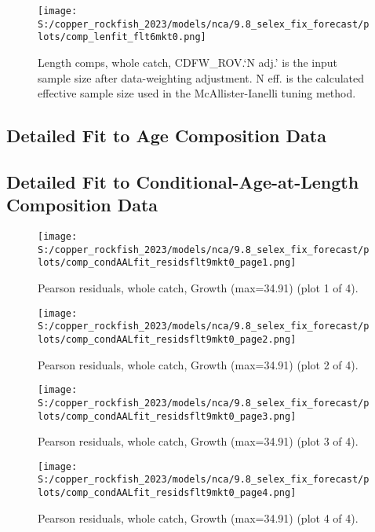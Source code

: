 \documentclass[11pt,
  english,
  letterpaper,
]{article}
\begin{document}
\begin{figure}
\centering
\texttt{[image: S:/copper\_rockfish\_2023/models/nca/9.8\_selex\_fix\_forecast/plots/comp\_lenfit\_flt6mkt0.png]}
\caption{Length comps, whole catch, CDFW\_ROV.`N adj.' is the input sample size after data-weighting adjustment. N eff. is the calculated effective sample size used in the McAllister-Ianelli tuning method.\label{fig:comp_lenfit_flt6mkt0}}
\end{figure}

\newpage

\hypertarget{age-data}{%
\subsection{Detailed Fit to Age Composition Data}\label{age-data}}

\newpage

\hypertarget{caal-data}{%
\subsection{Detailed Fit to Conditional-Age-at-Length Composition Data}\label{caal-data}}

\begin{figure}
\centering
\texttt{[image: S:/copper\_rockfish\_2023/models/nca/9.8\_selex\_fix\_forecast/plots/comp\_condAALfit\_residsflt9mkt0\_page1.png]}
\caption{Pearson residuals, whole catch, Growth (max=34.91) (plot 1 of 4).\label{fig:comp_condAALfit_residsflt9mkt0_page1}}
\end{figure}

\begin{figure}
\centering
\texttt{[image: S:/copper\_rockfish\_2023/models/nca/9.8\_selex\_fix\_forecast/plots/comp\_condAALfit\_residsflt9mkt0\_page2.png]}
\caption{Pearson residuals, whole catch, Growth (max=34.91) (plot 2 of 4).\label{fig:comp_condAALfit_residsflt9mkt0_page2}}
\end{figure}

\begin{figure}
\centering
\texttt{[image: S:/copper\_rockfish\_2023/models/nca/9.8\_selex\_fix\_forecast/plots/comp\_condAALfit\_residsflt9mkt0\_page3.png]}
\caption{Pearson residuals, whole catch, Growth (max=34.91) (plot 3 of 4).\label{fig:comp_condAALfit_residsflt9mkt0_page3}}
\end{figure}

\begin{figure}
\centering
\texttt{[image: S:/copper\_rockfish\_2023/models/nca/9.8\_selex\_fix\_forecast/plots/comp\_condAALfit\_residsflt9mkt0\_page4.png]}
\caption{Pearson residuals, whole catch, Growth (max=34.91) (plot 4 of 4).\label{fig:comp_condAALfit_residsflt9mkt0_page4}}
\end{figure}
\end{document}
